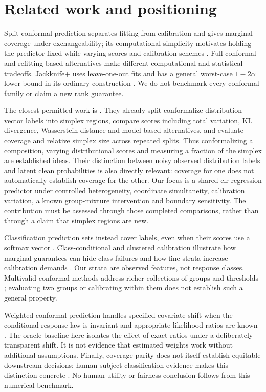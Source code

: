\section{Related work and positioning}
Split conformal prediction separates fitting from calibration and gives marginal coverage under exchangeability; its computational simplicity motivates holding the predictor fixed while varying scores and calibration schemes \citep{lei2017distribution,angelopoulos2022gentle}. Full conformal and refitting-based alternatives make different computational and statistical tradeoffs. Jackknife+ uses leave-one-out fits and has a general worst-case $1-2\alpha$ lower bound in its ordinary construction \citep{barber2020jackknife}. We do not benchmark every conformal family or claim a new rank guarantee.

The closest permitted work is \citet{javanmardi2024credal}. They already split-conformalize distribution-vector labels into simplex regions, compare scores including total variation, KL divergence, Wasserstein distance and model-based alternatives, and evaluate coverage and relative simplex size across repeated splits. Thus conformalizing a composition, varying distributional scores and measuring a fraction of the simplex are established ideas. Their distinction between noisy observed distribution labels and latent clean probabilities is also directly relevant: coverage for one does not automatically establish coverage for the other. Our focus is a shared clr-regression predictor under controlled heterogeneity, coordinate simultaneity, calibration variation, a known group-mixture intervention and boundary sensitivity. The contribution must be assessed through those completed comparisons, rather than through a claim that simplex regions are new.

Classification prediction sets instead cover labels, even when their scores use a softmax vector \citep{angelopoulos2022raps}. Class-conditional and clustered calibration illustrate how marginal guarantees can hide class failures and how fine strata increase calibration demands \citep{ding2023class}. Our strata are observed features, not response classes. Multivalid conformal methods address richer collections of groups and thresholds \citep{jung2022multivalid}; evaluating two groups or calibrating within them does not establish such a general property.

Weighted conformal prediction handles specified covariate shift when the conditional response law is invariant and appropriate likelihood ratios are known \citep{tibshirani2020shift}. The oracle baseline here isolates the effect of exact ratios under a deliberately transparent shift. It is not evidence that estimated weights work without additional assumptions. Finally, coverage parity does not itself establish equitable downstream decisions: human-subject classification evidence makes this distinction concrete \citep{cresswell2025disparate}. No human-utility or fairness conclusion follows from this numerical benchmark.
